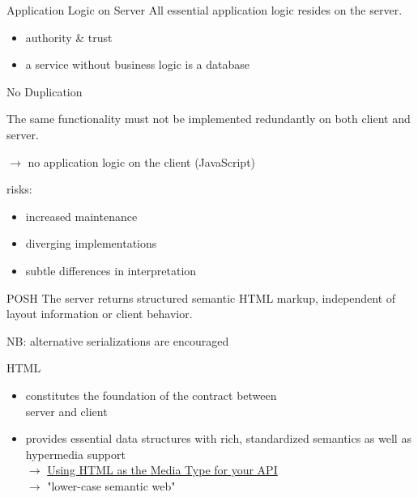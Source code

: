 \documentclass{beamer}
\begin{document}
\begin{frame}{Application Logic on Server}
  All essential application logic resides on the server.

  \begin{itemize}
    \item authority \& trust
    \item a service without business logic is a database
  \end{itemize}

\end{frame}

\begin{frame}{No Duplication}

  The same functionality must not be implemented redundantly on both client and server.

  \vspace*{0.25cm}
  \ensuremath{\rightarrow} no application logic on the client (JavaScript)

  \vspace*{0.5cm}
  risks:
  \begin{itemize}
    \item increased maintenance
    \item diverging implementations
    \item subtle differences in interpretation
  \end{itemize}
\end{frame}

\begin{frame}{POSH}
  The server returns structured semantic HTML markup, independent of layout information or client behavior.

  \vspace*{0.25cm}
  NB: alternative serializations are encouraged
\end{frame}

\begin{frame}{HTML}
  \begin{itemize}
    \item constitutes the foundation of the contract between \\ server and client
    \item provides essential data structures with rich, standardized semantics as well as hypermedia support
      \\
      \vspace*{0.25cm}
      \ensuremath{\rightarrow}
      \href{http://codeartisan.blogspot.de/2012/07/using-html-as-media-type-for-your-api.html}{Using HTML as the Media Type for your API}
      \\
      \vspace*{0.25cm}
      \ensuremath{\rightarrow}
      "lower-case semantic web"
  \end{itemize}
\end{frame}
\end{document}
